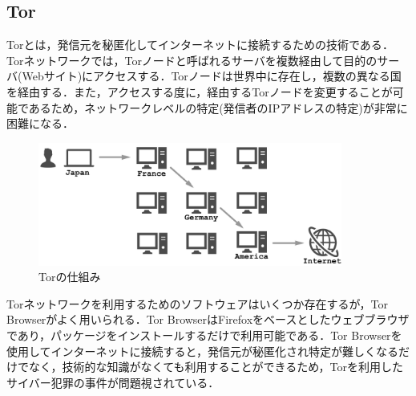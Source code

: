\documentclass[10pt, a4paper]{jreport}
\begin{document}

\subsection{Tor}
Torとは，発信元を秘匿化してインターネットに接続するための技術である\cite{torproject}．Torネットワークでは，Torノードと呼ばれるサーバを複数経由して目的のサーバ(Webサイト)にアクセスする．Torノードは世界中に存在し，複数の異なる国を経由する．また，アクセスする度に，経由するTorノードを変更することが可能であるため，ネットワークレベルの特定(発信者のIPアドレスの特定)が非常に困難になる．

\begin{figure}[H]
	\begin{center}
		\includegraphics[width=100mm]{figures/tor.pdf}
	\end{center}
	\caption{Torの仕組み}
	\label{fig: tor}
\end{figure}

Torネットワークを利用するためのソフトウェアはいくつか存在するが，Tor Browserがよく用いられる\cite{tor_browser}．Tor BrowserはFirefoxをベースとしたウェブブラウザであり，パッケージをインストールするだけで利用可能である．Tor Browserを使用してインターネットに接続すると，発信元が秘匿化され特定が難しくなるだけでなく，技術的な知識がなくても利用することができるため，Torを利用したサイバー犯罪の事件が問題視されている．

\end{document}
